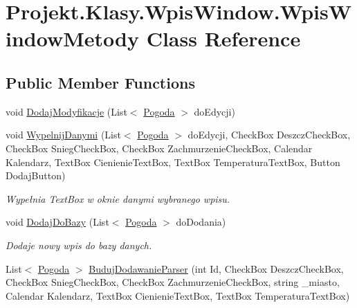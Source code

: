 \hypertarget{class_projekt_1_1_klasy_1_1_wpis_window_1_1_wpis_window_metody}{}\section{Projekt.\+Klasy.\+Wpis\+Window.\+Wpis\+Window\+Metody Class Reference}
\label{class_projekt_1_1_klasy_1_1_wpis_window_1_1_wpis_window_metody}
\subsection*{Public Member Functions}
\begin{DoxyCompactItemize}
\item 
void \mbox{\hyperlink{class_projekt_1_1_klasy_1_1_wpis_window_1_1_wpis_window_metody_a0bf2da932cdb7689e3f4cc5e1e0e0243}{Dodaj\+Modyfikacje}} (List$<$ \mbox{\hyperlink{class_projekt_1_1_baza_1_1_pogoda}{Pogoda}} $>$ do\+Edycji)
\item 
void \mbox{\hyperlink{class_projekt_1_1_klasy_1_1_wpis_window_1_1_wpis_window_metody_a8d36f2b484338666ab870d6c0cfd3ba4}{Wypelnij\+Danymi}} (List$<$ \mbox{\hyperlink{class_projekt_1_1_baza_1_1_pogoda}{Pogoda}} $>$ do\+Edycji, Check\+Box Deszcz\+Check\+Box, Check\+Box Snieg\+Check\+Box, Check\+Box Zachmurzenie\+Check\+Box, Calendar Kalendarz, Text\+Box Cienienie\+Text\+Box, Text\+Box Temperatura\+Text\+Box, Button Dodaj\+Button)
\begin{DoxyCompactList}\small\item\em Wypełnia Text\+Box w oknie danymi wybranego wpisu. \end{DoxyCompactList}\item 
void \mbox{\hyperlink{class_projekt_1_1_klasy_1_1_wpis_window_1_1_wpis_window_metody_a011d0008b8ca845eff27f2b90629c17d}{Dodaj\+Do\+Bazy}} (List$<$ \mbox{\hyperlink{class_projekt_1_1_baza_1_1_pogoda}{Pogoda}} $>$ do\+Dodania)
\begin{DoxyCompactList}\small\item\em Dodaje nowy wpis do bazy danych. \end{DoxyCompactList}\item 
List$<$ \mbox{\hyperlink{class_projekt_1_1_baza_1_1_pogoda}{Pogoda}} $>$ \mbox{\hyperlink{class_projekt_1_1_klasy_1_1_wpis_window_1_1_wpis_window_metody_a79fc019266feb11020642110c63c4402}{Buduj\+Dodawanie\+Parser}} (int Id, Check\+Box Deszcz\+Check\+Box, Check\+Box Snieg\+Check\+Box, Check\+Box Zachmurzenie\+Check\+Box, string \+\_\+miasto, Calendar Kalendarz, Text\+Box Cienienie\+Text\+Box, Text\+Box Temperatura\+Text\+Box)

\end{DoxyCompactItemize}
